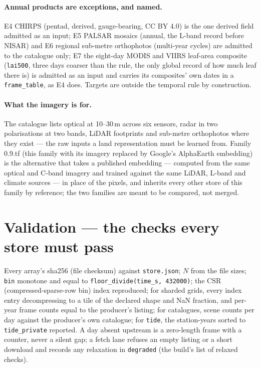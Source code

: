 \documentclass[10pt]{article}
\newcommand{\code}[1]{\texttt{#1}}
\begin{document}
\paragraph{Annual products are exceptions, and named.} E4 CHIRPS (pentad,
derived, gauge-bearing, CC BY 4.0) is the one derived field admitted as an
input; E5 PALSAR mosaics (annual, the L-band record before NISAR) and E6
regional sub-metre orthophotos (multi-year cycles) are admitted to the
catalogue only; E7 the eight-day MODIS and VIIRS leaf-area composite
(\code{lai500}, three days coarser than the rule, the only global record of
how much leaf there is) is admitted as an input and carries its composites'
own dates in a \code{frame\_table}, as E4 does. Targets are outside the
temporal rule by construction.

\paragraph{What the imagery is for.} The catalogue lists optical at 10--30\,m
across six sensors, radar in two polarisations at two bands, LiDAR footprints
and sub-metre orthophotos where they exist --- the raw inputs a land
representation must be learned from. Family 0.9.tf (this family with its imagery replaced by Google's AlphaEarth embedding) is the alternative that
takes a published embedding --- computed from the same optical and C-band
imagery and trained against the same LiDAR, L-band and climate sources ---
in place of the pixels, and inherits every other store of this family by reference; the two families are meant to be compared, not
merged.

\section{Validation --- the checks every store must pass}

\sloppy Every array's sha256 (file checksum) against \code{store.json}; $N$ from the file sizes;
\code{bin} monotone and equal to \code{floor\_divide(time\_s, 432000)}; the
CSR (compressed-sparse-row bin) index reproduced; for sharded grids, every index entry decompressing to a
tile of the declared shape and NaN fraction, and per-year frame counts equal
to the producer's listing; for catalogues, scene counts per day against the
producer's own catalogue; for \code{tide}, the station-years sorted to \code{tide\_private}
reported. A day absent upstream is a zero-length frame
with a counter, never a silent gap; a fetch lane refuses an empty listing or
a short download and records any relaxation in \code{degraded} (the build's list of relaxed checks).\par\fussy
\end{document}
